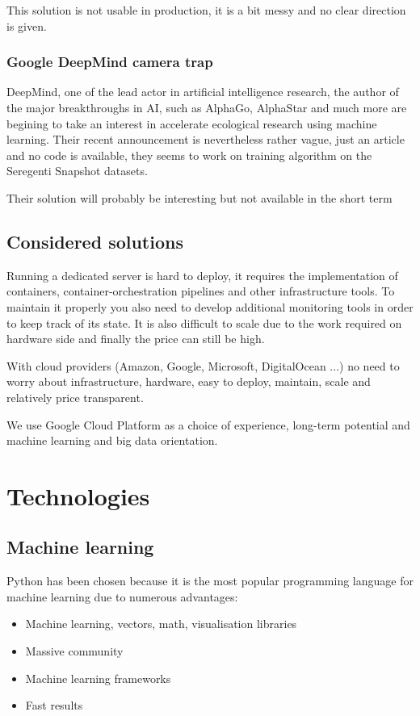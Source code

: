 This solution is not usable in production, it is a bit messy and no clear direction is given.
\subsubsection{Google DeepMind camera trap}
DeepMind, one of the lead actor in artificial intelligence research, the author of the major breakthroughs in AI, such as AlphaGo\cite{alphago}, AlphaStar\cite{alphastar} and much more are begining to take an interest in accelerate ecological research using machine learning\cite{deepmind_camera_trap}.
Their recent announcement is nevertheless rather vague, just an article and no code is available, they seems to work on training algorithm on the Seregenti Snapshot datasets.

Their solution will probably be interesting but not available in the short term

\subsection{Considered solutions}
Running a dedicated server is hard to deploy, it requires the implementation of containers, container-orchestration pipelines and other infrastructure tools.
To maintain it properly you also need to develop additional monitoring tools in order to keep track of its state.
It is also difficult to scale due to the work required on hardware side and finally the price can still be high.

With cloud providers (Amazon, Google, Microsoft, DigitalOcean ...) no need to worry about infrastructure, hardware, easy to deploy, maintain, scale and relatively price transparent.

We use Google Cloud Platform as a choice of experience, long-term potential and machine learning and big data orientation.


\pagebreak\section{Technologies}
\subsection{Machine learning}
Python has been chosen because it is the most popular programming language for machine learning\cite{python_machine_learning} due to numerous advantages:
\begin{itemize}
    \item Machine learning, vectors, math, visualisation libraries
    \item Massive community
    \item Machine learning frameworks
    \item Fast results
\end{itemize}


